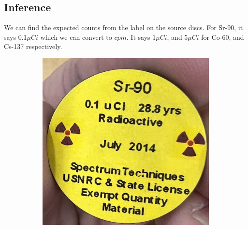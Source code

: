 \documentclass[twocolumn]{article}
\begin{document}
\subsection*{Inference}
We can find the expected counts from the label on the source discs. For Sr-90, it says 0.1$\mu Ci$ which we can convert to $cpm$. It says $1\mu Ci$, and $5\mu Ci$ for Co-60, and Cs-137 respectively.


\begin{figure}[htbp]
    \begin{minipage}[t]{0.45\linewidth}
        \centering
        \begin{subfigure}{\linewidth}
            \includegraphics[width=\linewidth]{lab5_a.png}
            

\end{subfigure}
\end{minipage}
\end{figure}
\end{document}
